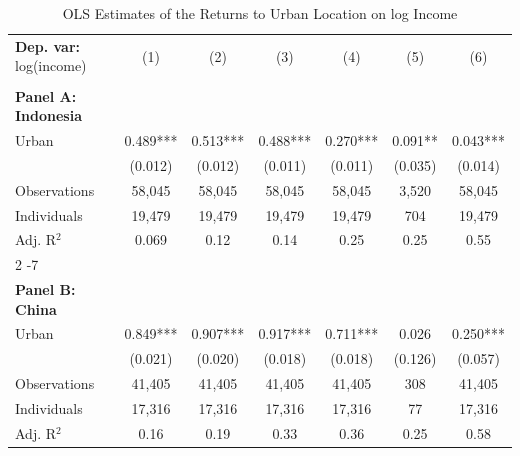 \begin{table}[htbp] \centering \begin{threeparttable}
 \caption{OLS Estimates of the Returns to Urban Location on log Income} 
 \label{tab:OLS_income_urban_unb} 
\begin{tabular}{l cccccc} \toprule  \textbf{Dep. var:}  log(income) 
                    &\multicolumn{1}{c}{(1)}   &\multicolumn{1}{c}{(2)}   &\multicolumn{1}{c}{(3)}   &\multicolumn{1}{c}{(4)}   &\multicolumn{1}{c}{(5)}   &\multicolumn{1}{c}{(6)}   \\
                    &               &               &               &               &               &               \\
\textbf{Panel A: Indonesia} \\
Urban               &       0.489***&       0.513***&       0.488***&       0.270***&       0.091** &       0.043***\\
                    &     (0.012)   &     (0.012)   &     (0.011)   &     (0.011)   &     (0.035)   &     (0.014)   \\
\addlinespace
Observations        &      58,045   &      58,045   &      58,045   &      58,045   &       3,520   &      58,045   \\
Individuals         &      19,479   &      19,479   &      19,479   &      19,479   &         704   &      19,479   \\
Adj. R$^{2}$        &       0.069   &        0.12   &        0.14   &        0.25   &        0.25   &        0.55   \\
\cmidrule{2 -7}
                    &               &               &               &               &               &               \\
\textbf{Panel B: China} \\
Urban               &       0.849***&       0.907***&       0.917***&       0.711***&       0.026   &       0.250***\\
                    &     (0.021)   &     (0.020)   &     (0.018)   &     (0.018)   &     (0.126)   &     (0.057)   \\
\addlinespace
Observations        &      41,405   &      41,405   &      41,405   &      41,405   &         308   &      41,405   \\
Individuals         &      17,316   &      17,316   &      17,316   &      17,316   &          77   &      17,316   \\
Adj. R$^{2}$        &        0.16   &        0.19   &        0.33   &        0.36   &        0.25   &        0.58   \\

\end{tabular}
\end{threeparttable}
\end{table}
